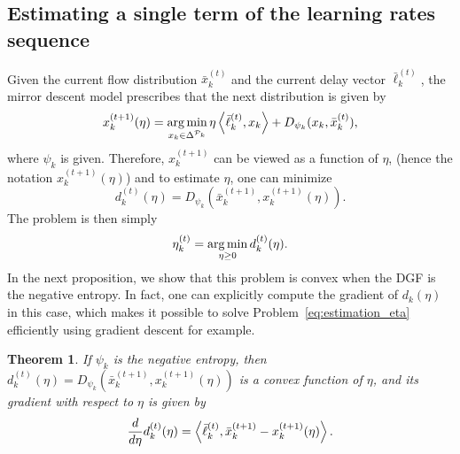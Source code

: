 \documentclass{sig-alternate-ipsn13}
\newtheorem{theorem}{Theorem}
\begin{document}
\subsection{Estimating a single term of the learning rates sequence}
Given the current flow distribution $\bar x^{(t)}_k$ and the current delay vector $\bar \ell^{(t)}_k$, the mirror descent model prescribes that the next distribution is given by
\begin{equation}
\label{eq:MD_update_estimation}
x_k^{(t+1)}(\eta) = \operatorname*{arg\,min}_{x_k \in \Delta^{\mathcal{P}_k}} \eta \left\langle \bar \ell_k^{(t)}, x_k \right\rangle + D_{\psi_k}(x_k, \bar x^{(t)}_k),
\end{equation}
where $\psi_k$ is given. Therefore, $x^{(t+1)}_k$ can be viewed as a function of $\eta$, (hence the notation $x_k^{(t+1)}(\eta)$) and to estimate $\eta$, one can minimize
\[
d^{(t)}_k(\eta) = D_{\psi_k}(\bar x_k^{(t+1)}, x_k^{(t+1)}(\eta)).
\]
The problem is then simply
\begin{equation}
\label{eq:estimation_eta}
\eta_k^{(t)} = \operatorname*{arg\,min}_{\eta \geq 0} d^{(t)}_k(\eta).
\end{equation}
In the next proposition, we show that this problem is convex when the DGF is the negative entropy. In fact, one can explicitly compute the gradient of $d_k(\eta)$ in this case, which makes it possible to solve Problem~\eqref{eq:estimation_eta} efficiently using gradient descent for example.
\begin{theorem}
If $\psi_k$ is the negative entropy, then $d_k^{(t)}(\eta) = D_{\psi_k}(\bar x_k^{(t+1)}, x_k^{(t+1)}(\eta))$ is a convex function of $\eta$, and its gradient with respect to $\eta$ is given by
\[
\frac{d}{d\eta} d_k^{(t)}(\eta) = \left\langle \bar \ell^{(t)}_{k}, {\bar x^{(t+1)}_k} - x^{(t+1)}_k(\eta) \right\rangle.
\]
\end{theorem}
\end{document}
